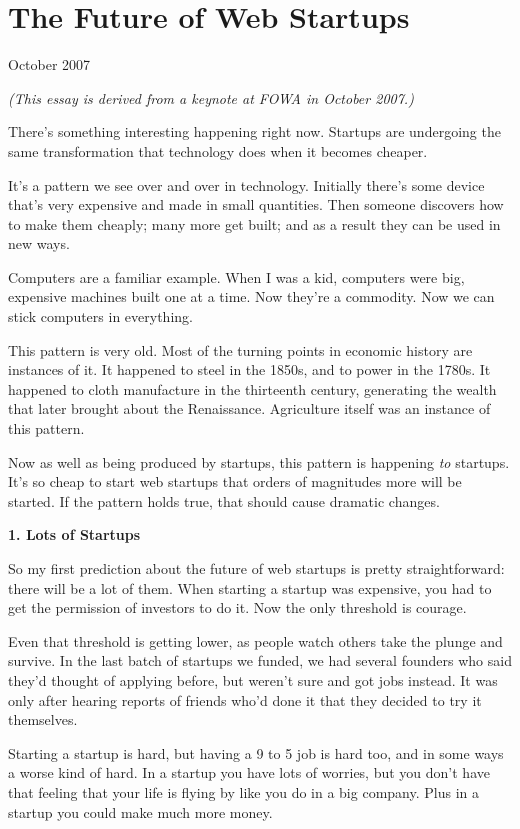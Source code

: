\chapter{The Future of Web Startups}

October 2007

\emph{(This essay is derived from a keynote at FOWA in October 2007.)}

There's something interesting happening right now. Startups are
undergoing the same transformation that technology does when it becomes
cheaper.

It's a pattern we see over and over in technology. Initially there's
some device that's very expensive and made in small quantities. Then
someone discovers how to make them cheaply; many more get built; and as
a result they can be used in new ways.

Computers are a familiar example. When I was a kid, computers were big,
expensive machines built one at a time. Now they're a commodity. Now we
can stick computers in everything.

This pattern is very old. Most of the turning points in economic history
are instances of it. It happened to steel in the 1850s, and to power in
the 1780s. It happened to cloth manufacture in the thirteenth century,
generating the wealth that later brought about the Renaissance.
Agriculture itself was an instance of this pattern.

Now as well as being produced by startups, this pattern is happening
\emph{to} startups. It's so cheap to start web startups that orders of
magnitudes more will be started. If the pattern holds true, that should
cause dramatic changes.

\textbf{1. Lots of Startups}

So my first prediction about the future of web startups is pretty
straightforward: there will be a lot of them. When starting a startup
was expensive, you had to get the permission of investors to do it. Now
the only threshold is courage.

Even that threshold is getting lower, as people watch others take the
plunge and survive. In the last batch of startups we funded, we had
several founders who said they'd thought of applying before, but weren't
sure and got jobs instead. It was only after hearing reports of friends
who'd done it that they decided to try it themselves.

Starting a startup is hard, but having a 9 to 5 job is hard too, and in
some ways a worse kind of hard. In a startup you have lots of worries,
but you don't have that feeling that your life is flying by like you do
in a big company. Plus in a startup you could make much more money.

